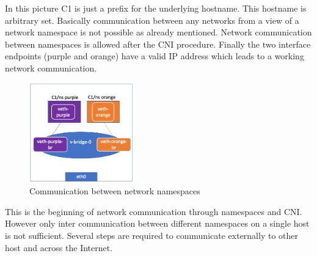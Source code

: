 In this picture C1 is just a prefix for the underlying hostname. This hostname is arbitrary set. 
Basically communication between any networks from a view of a network namespace is not possible as already mentioned. 
Network communication between namespaces is allowed after the CNI procedure. 
Finally the two interface endpoints (purple and orange) have a valid IP address which leads to a working network communication.
\begin{figure}[htbp]
 \centering
 \includegraphics[width=0.4\textwidth]{gfx/examples/network_ns}
 \caption{Communication between network namespaces}
\label{sec:intro:containerization:linux_namespaces:netowork_ns}
\end{figure}
This is the beginning of network communication through namespaces and CNI. 
However only inter communication between different namespaces on a single host is not sufficient. 
Several steps are required to communicate externally to other host and across the Internet.

